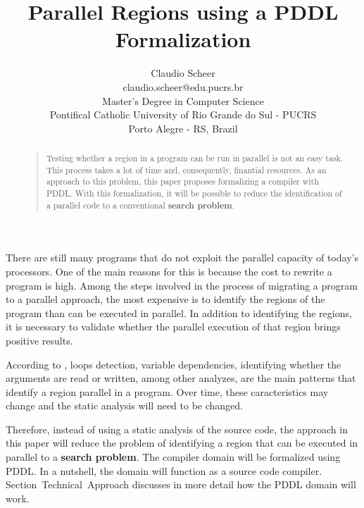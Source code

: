 \documentclass[letterpaper]{article}
\begin{document}
\title{Parallel Regions using a PDDL Formalization}
\author{Claudio Scheer\\
  claudio.scheer@edu.pucrs.br\\
  Master's Degree in Computer Science\\
  Pontifical Catholic University of Rio Grande do Sul - PUCRS\\
  Porto Alegre - RS, Brazil\\
}
\maketitle


\begin{abstract}
  \begin{quote}
    Testing whether a region in a program can be run in parallel is not an easy task. This process takes a lot of time and, consequently, finantial resources. As an approach to this problem, this paper proposes formalizing a compiler with PDDL. With this formalization, it will be possible to reduce the identification of a parallel code to a conventional \textbf{search problem}.
  \end{quote}
\end{abstract}


\noindent There are still many programs that do not exploit the parallel capacity of today's processors. One of the main reasons for this is because the cost to rewrite a program is high. Among the steps involved in the process of migrating a program to a parallel approach, the most expensive is to identify the regions of the program than can be executed in parallel. In addition to identifying the regions, it is necessary to validate whether the parallel execution of that region brings positive results.

According to \cite{doi:10.1177/1094342017695639}, loops detection, variable dependencies, identifying whether the arguments are read or written, among other analyzes, are the main patterns that identify a region parallel in a program. Over time, these caracteristics may change and the static analysis will need to be changed.

Therefore, instead of using a static analysis of the source code, the approach in this paper will reduce the problem of identifying a region that can be executed in parallel to a \textbf{search problem}. The compiler domain will be formalized using PDDL. In a nutshell, the domain will function as a source code compiler. Section~Technical~Approach discusses in more detail how the PDDL domain will work.
\end{document}
